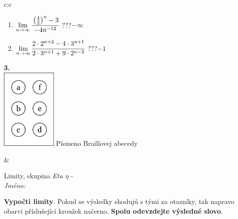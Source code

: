 \documentclass[10pt]{report}
\begin{document}
\begin{tabular}{c:c}
\begin{minipage}[c][104.5mm][t]{0.5\linewidth}
\begin{center}
\begin{minipage}{0.79\linewidth}
\begin{center}
\begin{varwidth}{\linewidth}
\begin{enumerate}
\item $\lim\limits_{n\to\infty}\cfrac{\left(\frac{4}{2}\right)^n -3}{-4n^{-12}}$\quad \dotfill\; ???\;\dotfill \quad $-\infty$
\item $\lim\limits_{n\to\infty}\cfrac{2\cdot 2^{n+2}-4\cdot 3^{n+1}}{2\cdot 3^{n+1}+9\cdot 2^{n-2}}$\quad \dotfill\; ???\;\dotfill \quad $-1$
\end{enumerate}
\end{varwidth}
\end{center}
\end{minipage}
\begin{minipage}{0.20\linewidth}
\begin{center}
{\Huge\bfseries 3.} \\[2mm]
\includegraphics[height=40mm]{../images/braille.png}
{\small Písmeno Braillovej abecedy}
\end{center}
\end{minipage}
\end{center}
\end{minipage}
&
\begin{minipage}[c][104.5mm][t]{0.5\linewidth}
\begin{center}
\vspace{7mm}
{\huge Limity, skupina \textit{Eta $\eta$} -}\\[5mm]
\textit{Jméno:}\phantom{xxxxxxxxxxxxxxxxxxxxxxxxxxxxxxxxxxxxxxxxxxxxxxxxxxxxxxxxxxxxxxxxx}\\[5mm]
\begin{minipage}{0.95\linewidth}
\begin{center}
\textbf{Vypočti limity}. Pokud se výsledky shodujú s tými za otazníky, tak napravo\\obarvi příslušející kroužek načerno. \textbf{Spolu odevzdejte výsledné slovo}.
\end{center}
\end{minipage}
\\[1mm]
\begin{minipage}{0.79\linewidth}
\begin{center}
\begin{varwidth}{\linewidth}

\end{varwidth}
\end{center}
\end{minipage}
\end{center}
\end{minipage}
\end{tabular}
\end{document}
